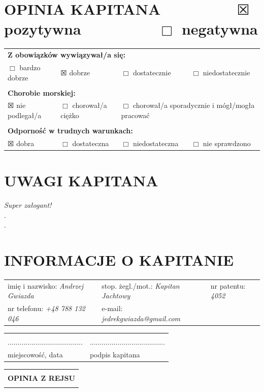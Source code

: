 \documentclass{article}
\begin{document}
\section*{OPINIA KAPITANA ~~~~~~~~ $\XBox$ pozytywna ~~~~~~~~ $\Box$ negatywna}

\begin{tabularx}{\textwidth}{X X X X}
\multicolumn{4}{l}{\textbf{Z obowiązków wywiązywał/a się:}}\\
$\Box$ bardzo dobrze & $\XBox$ dobrze & $\Box$ dostatecznie & $\Box$ niedostatecznie\\
\\
\multicolumn{4}{l}{\textbf{Chorobie morskiej:}}\\
$\XBox$ nie podlegał/a & $\Box$ chorował/a ciężko & \multicolumn{2}{l}{$\Box$ chorował/a sporadycznie i mógł/mogła pracować}\\
\\
\multicolumn{4}{l}{\textbf{Odporność w trudnych warunkach:}}\\
$\XBox$ dobra & $\Box$ dostateczna & $\Box$ niedostateczna & $\Box$ nie sprawdzono\\
\end{tabularx}

\section*{UWAGI KAPITANA}


\textit{Super załogant!}\dotfill \\
.\dotfill \\
.\dotfill \\
\section*{INFORMACJE O KAPITANIE}
\begin{tabularx}{\textwidth}{X X X}
imię i nazwisko: \textit{Andrzej Gwiazda} & stop. żegl./mot.: \textit{Kapitan Jachtowy} & nr patentu: \textit{4052} \\
nr telefonu: \textit{+48 788 132 046} & e-mail: \textit{jedrekgwiazda@gmail.com} \\
\end{tabularx}

\begin{tabularx}{\textwidth}{X X}
\\\\
...................................... & ......................................\\
miejscowość, data & podpis kapitana\\
\end{tabularx}
\newpage
\begin{tabularx}{\textwidth} { 
  | >{\centering\arraybackslash}X | }
 \hline
 \\
 \textbf{\huge OPINIA Z REJSU} \\
 \\
\hline
\end{tabularx}
\end{document}
